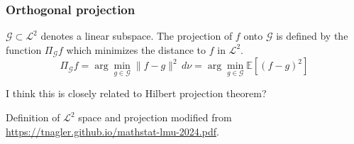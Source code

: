 \subsubsection*{Orthogonal projection}
$\mathcal{G} \subset \mathcal{L}^2$ denotes a linear subspace. The projection of $f$ onto $\mathcal{G}$ is defined by the function $\Pi_{\mathcal{G}}f$ which minimizes the distance to $f$ in $\mathcal{L}^2$.
\[
\Pi_{\mathcal{G}}f = \arg\min_{g \in \mathcal{G}} \|f - g\|^2 \, d\nu
= \arg\min_{g \in \mathcal{G}} \mathbb{E}[(f - g)^2]
\]

{\color{blue}I think this is closely related to Hilbert projection theorem?}\par
Definition of $\mathcal{L}^2$ space and projection modified from \href{https://tnagler.github.io/mathstat-lmu-2024.pdf}{https://tnagler.github.io/mathstat-lmu-2024.pdf}.

